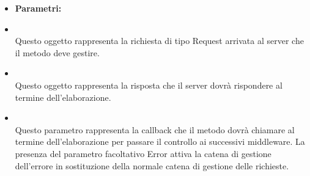 \begin{itemize}
\begin{itemize}\addtolength{\itemsep}{-0.5\baselineskip}
\item[] \textbf{Parametri:}
\item[]  \\ Questo oggetto rappresenta la richiesta di tipo Request arrivata al server che il metodo deve gestire.
\item[]  \\ Questo oggetto rappresenta la risposta che il server dovrà rispondere al termine dell'elaborazione.
\item[]  \\ Questo parametro rappresenta la callback che il metodo dovrà chiamare al termine dell'elaborazione per passare il controllo ai successivi middleware. La presenza del parametro facoltativo Error attiva la catena di gestione dell'errore in sostituzione della normale catena di gestione delle richieste.
\end{itemize}
\end{itemize}

